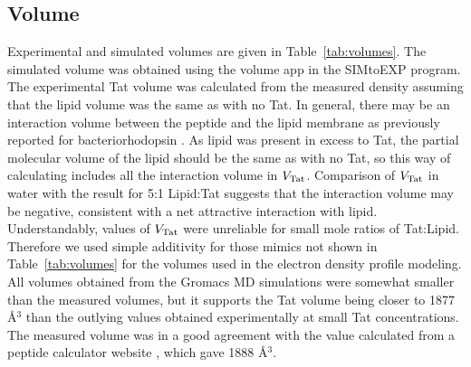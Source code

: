 \subsection{Volume}\label{sec:volume_results}
Experimental and simulated volumes are given in Table~\ref{tab:volumes}. The simulated volume was
obtained using the volume app in the SIMtoEXP program. The experimental Tat volume was
calculated from the measured density assuming that the lipid volume was the same as with no
Tat. In general, there may be an interaction volume between the peptide and the lipid membrane
as previously reported for bacteriorhodopsin \cite{Tristram-Nagle86}. As lipid was present in excess to Tat, the
partial molecular volume of the lipid should be the same as with no Tat, so this way of
calculating includes all the interaction volume in $V_\textrm{Tat}$. Comparison of $V_\textrm{Tat}$ in water with the
result for 5:1 Lipid:Tat suggests that the interaction volume may be negative, consistent with a
net attractive interaction with lipid. Understandably, values of $V_\textrm{Tat}$ were unreliable for small
mole ratios of Tat:Lipid. Therefore we used simple additivity for those mimics not shown in
Table~\ref{tab:volumes} for the volumes used in the electron density profile modeling. 
All volumes obtained from the Gromacs MD
simulations were somewhat smaller than the measured volumes, but it supports the Tat volume
being closer to 1877 \AA$^3$ than the outlying values obtained experimentally at small Tat
concentrations. The measured volume was in a good agreement with the 
value calculated from a peptide calculator website \cite{peptide_calc}, which
gave 1888 \AA$^3$. 


